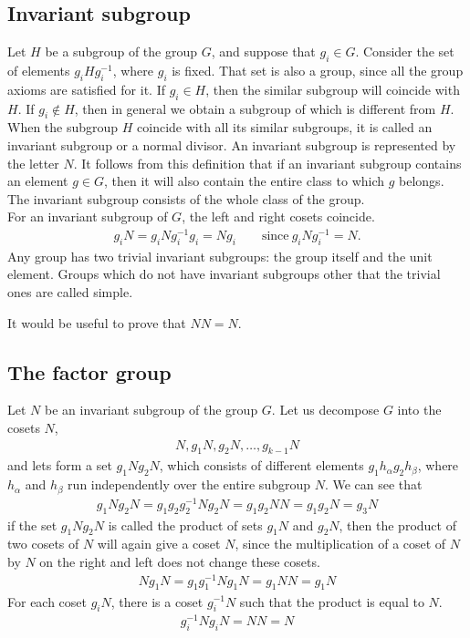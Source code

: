 
\subsection{Invariant subgroup}
Let $H$ be a subgroup of the group $G$, and suppose that $g_i\in G$. Consider
the set of elements $g_iHg^{-1}_i$, where $g_i$ is fixed. That set is also
a group, since all the group axioms are satisfied for it.
If $g_i\in H$, then the similar subgroup will coincide with $H$. If $g_i\notin H$,
then in general we obtain a subgroup of which is different from $H$. When the
subgroup $H$ coincide with all its similar subgroups, it is called an invariant
subgroup or a normal divisor. An invariant subgroup is represented by the letter
$N$. It follows from this definition that if an invariant subgroup contains an
element $g\in G$, then it will also contain the entire class to which $g$
belongs. The invariant subgroup consists of the whole class of the group.\\

For an invariant subgroup of $G$, the left and right cosets coincide.
\begin{align}
    g_iN=g_iNg_i^{-1}g_i=Ng_i\qquad\text{since}\ g_iNg_i^{-1}=N.
\end{align}
Any group has two trivial invariant subgroups: the group itself and the unit
element. Groups which do not have invariant subgroups other that the trivial
ones are called simple.

It would be useful to prove that $NN=N$.

\subsection{The factor group} %
\label{sub:The factor group}

Let $N$ be an invariant subgroup of the group $G$. Let us decompose $G$ into the
cosets $N$,
\begin{align}
    N, g_1N, g_2N,\dots,g_{k-1}N
\end{align}
and lets form a set $g_1Ng_2N$, which consists of different elements
$g_1h_\alpha g_2h_\beta$, where $h_\alpha$ and $h_\beta$ run independently over
the entire subgroup $N$. We can see that
\begin{align}
    g_1Ng_2N=g_1g_2g_2^{-1}Ng_2N=g_1g_2NN=g_1g_2N=g_3N
\end{align}
if the set $g_1Ng_2N$ is called the product of sets $g_1N$ and $g_2N$, then the
product of two cosets of $N$ will again give a coset $N$, since the multiplication
of a coset of $N$ by $N$ on the right and left does not change these cosets.
\begin{align}
    Ng_1N=g_1g_1^{-1}Ng_1N=g_1NN=g_1N
\end{align}
For each coset $g_iN$, there is a coset $g_i^{-1}N$ such that the product is
equal to $N$.
\begin{align}
    g_i^{-1}Ng_iN=NN=N
\end{align}


